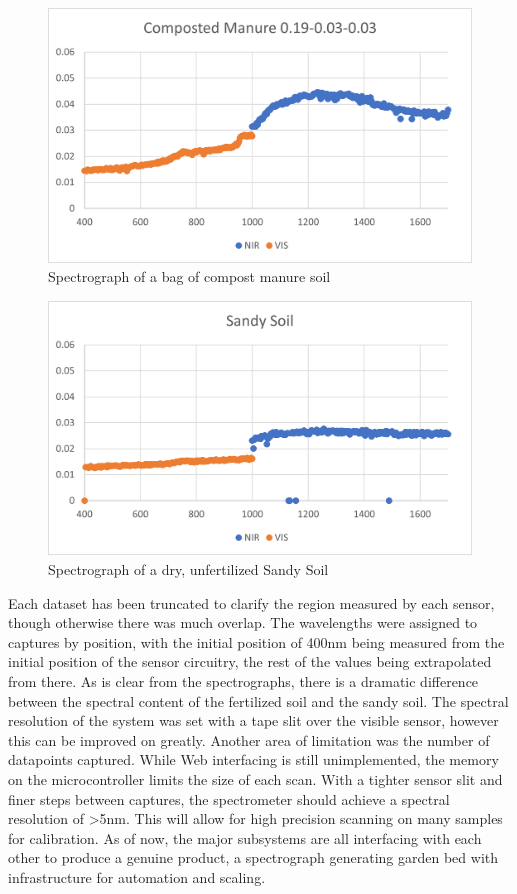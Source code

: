 \documentclass[journal]{IEEEtran}
\begin{document}
\begin{figure}[H]
   \centering
   \label{fig:Data2}
   \includegraphics[width=\linewidth]{images/Data2.png}
   \caption{Spectrograph of a bag of compost manure soil}
\end{figure} \begin{figure}[H]
   \centering
   \label{fig:Data3}
   \includegraphics[width=\linewidth]{images/Data3.png}
   \caption{Spectrograph of a dry, unfertilized Sandy Soil}
\end{figure}
Each dataset has been truncated to clarify the region measured by each sensor, though otherwise there was much overlap. The wavelengths were assigned to captures by position, with the initial position of 400nm being measured from the initial position of the sensor circuitry, the rest of the values being extrapolated from there. As is clear from the spectrographs, there is a dramatic difference between the spectral content of the fertilized soil and the sandy soil. The spectral resolution of the system was set with a tape slit over the visible sensor, however this can be improved on greatly. Another area of limitation was the number of datapoints captured. While Web interfacing is still unimplemented, the memory on the microcontroller limits the size of each scan. With a tighter sensor slit and finer steps between captures, the spectrometer should achieve a spectral resolution of >5nm. This will allow for high precision scanning on many samples for calibration.
As of now, the major subsystems are all interfacing with each other to produce a genuine product, a spectrograph generating garden bed with infrastructure for automation and scaling.

\end{document}
